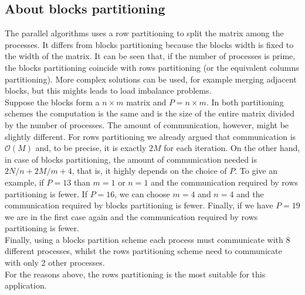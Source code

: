 \documentclass{article}
\begin{document}
\subsection{About blocks partitioning} \label{sec:blockpartitioning}
The parallel algorithms uses a row partitioning to split the matrix among the processes. It differs from blocks partitioning because the blocks width is fixed to the width of the matrix. It can be seen that, if the number of processes is prime, the blocks partitioning coincide with rows partitioning (or the equivalent columns partitioning). More complex solutions can be used, for example merging adjacent blocks, but this mights leads to load imbalance problems. \\
Suppose the blocks form a $n \times m$ matrix and $P = n \times m$. In both partitioning schemes the computation is the same and is the size of the entire matrix divided by the number of processes. The amount of communication, however, might be slightly different. For rows partitioning we already argued that communication is $\mathcal{O}(M)$ and, to be precise, it is exactly $2M$ for each iteration. On the other hand, in case of blocks partitioning, the amount of communication needed is $2N/n + 2M/m + 4$, that is, it highly depends on the choice of $P$. To give an example, if $P = 13$ than $m = 1$ or $n = 1$ and the communication required by rows partitioning is fewer. If $P = 16$, we can choose $m = 4$ and $n = 4$ and the communication required by blocks partitioning is fewer. Finally, if we have $P = 19$ we are in the first case again and the communication required by rows partitioning is fewer. \\
Finally, using a blocks partition scheme each process must communicate with 8 different processes, whilst the rows partitioning scheme need to communicate with only 2 other processes. \\
For the reasons above, the rows partitioning is the most suitable for this application.
\end{document}
